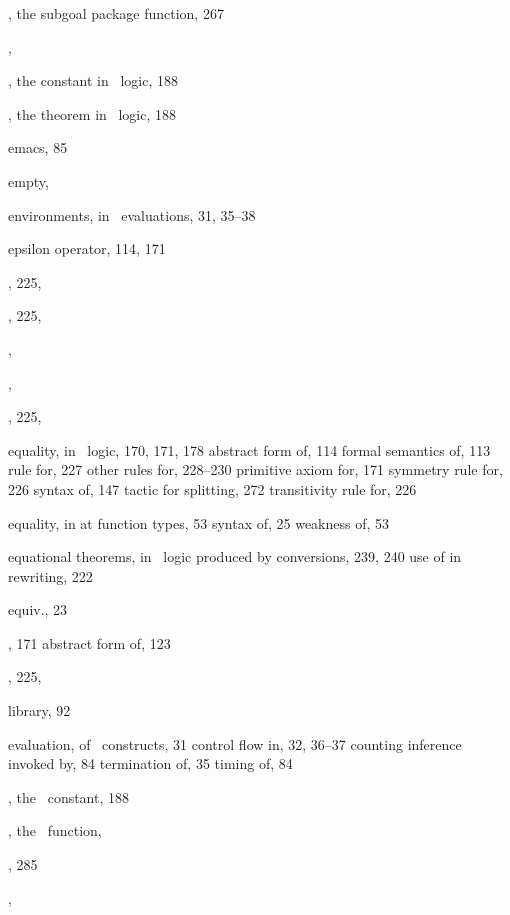 \begin{theindex}
  \item {}, the subgoal package function, 267
  \item {}, 
  \item {}, the constant in \HOL\ logic, 188
  \item {}, the theorem in \HOL\ logic, 188
  \item emacs, 85
  \item empty, 
  \item environments, in \ML\ evaluations, 31, 35--38
  \item epsilon operator, 114, 171
  \item {}, 225, 
  \item {}, 225, 
  \item {}, 
  \item {}, 
  \item {}, 225, 
  \item equality, in \HOL\ logic, 170, 171, 178
    \subitem abstract form of, 114
    \subitem formal semantics of, 113
    \subitem {} rule for, 227
    \subitem other rules for, 228--230
    \subitem primitive axiom for, 171
    \subitem symmetry rule for, 226
    \subitem syntax of, 147
    \subitem tactic for splitting, 272
    \subitem transitivity rule for, 226
  \item equality, in \ML
    \subitem at function types, 53
    \subitem syntax of, 25
    \subitem weakness of, 53
  \item equational theorems, in \HOL\ logic
    \subitem produced by conversions, 239, 240
    \subitem use of in rewriting, 222
  \item equiv., 23
  \item {}, 171
    \subitem abstract form of, 123
  \item {}, 225, 
  \item {} library, 92
  \item evaluation, of \ML\ constructs, 31
    \subitem control flow in, 32, 36--37
    \subitem counting inference invoked by, 84
    \subitem termination of, 35
    \subitem timing of, 84
  \item {}, the \HOL\ constant, 188
  \item {}, the \ML\ function, 
  \item {}, 285
  \item {}, 

\end{theindex}

